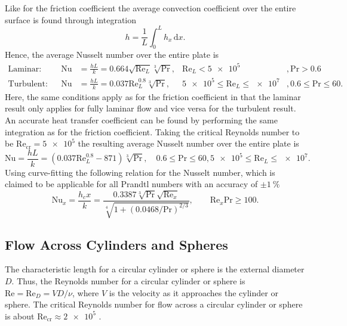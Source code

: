 Like for the friction coefficient the average convection coefficient over the entire surface is found through integration 
\begin{equation*}
  h = \frac{1}{L} \int_{0}^{L} h_x \, \mathrm{d}x 
.\end{equation*}
Hence, the average Nusselt number over the entire plate is 
\begin{align}
  \text{Laminar:}& & \mathrm{Nu} &= \frac{h L}{k} = \num{0,664} \sqrt{\mathrm{Re}_L} \sqrt[3]{\mathrm{Pr}}, & \mathrm{Re}_L < \num{5e5}&, \mathrm{Pr} > \num{0,6}    \\
  \text{Turbulent:}& & \mathrm{Nu} &= \frac{h L}{k} = \num{0,037} \mathrm{Re}_L^{\num{0,8} } \sqrt[3]{\mathrm{Pr}}, & \num{5e5} \leq \mathrm{Re}_L \leq \num{e7}&, \num{0,6} \leq \mathrm{Pr} \leq \num{60} 
.\end{align}
Here, the same conditions apply as for the friction coefficient in that the laminar result only applies for fully laminar flow and vice versa for the turbulent result.
An accurate heat transfer coefficient can be found by performing the same integration as for the friction coefficient.
Taking the critical Reynolds number to be $\mathrm{Re}_{\mathrm{cr}} = \num{5e5} $ the resulting average Nusselt number over the entire plate is 
\begin{equation*}
  \mathrm{Nu} = \frac{h L}{k} = \left( \num{0,037} \mathrm{Re}_L^{\num{0,8} } - \num{871} \right) \sqrt[3]{\mathrm{Pr}}, \quad \num{0,6} \leq \mathrm{Pr} \leq \num{60}, \num{5e5} \leq \mathrm{Re}_L \leq \num{e7} 
.\end{equation*}
Using curve-fitting the following relation for the Nusselt number, which is claimed to be applicable for all Prandtl numbers with an accuracy of $\pm \qty{1}{\percent}$ 
\begin{equation*}
  \mathrm{Nu}_x = \frac{h_c x}{k} = \frac{\num{0,3387} \sqrt[3]{\mathrm{Pr}} \sqrt{\mathrm{Re}_x}}{\sqrt[4]{1 + \left( \num{0,0468} / \mathrm{Pr} \right)^{2 / 3}}}, \qquad \mathrm{Re}_x \mathrm{Pr} \geq \num{100}
.\end{equation*}

\subsection{Flow Across Cylinders and Spheres}
The characteristic length for a circular cylinder or sphere is the external diameter $D$.
Thus, the Reynolds number for a circular cylinder or sphere is $\mathrm{Re} = \mathrm{Re}_D = V D / \nu$, where $V$ is the velocity as it approaches the cylinder or sphere.
The critical Reynolds number for flow across a circular cylinder or sphere is about $\mathrm{Re}_{\mathrm{cr}} \approx \num{2e5} $ .

